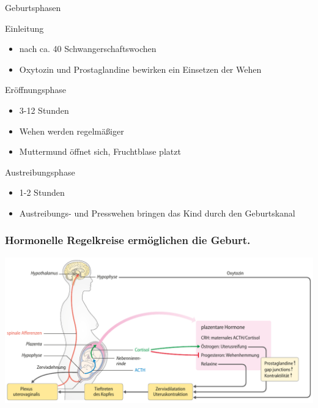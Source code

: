 \documentclass{beamer}
\begin{document}
\begin{frame}{Geburtsphasen}

\begin{block}{Einleitung}
\begin{itemize}
\item
nach ca.  40 Schwangerschaftswochen
\item
Oxytozin und Prostaglandine bewirken ein Einsetzen der Wehen
\end{itemize}
\end{block}

\pause

\begin{block}{Eröffnungsphase}
\begin{itemize}
\item
3-12 Stunden
\item
Wehen werden regelmäßiger
\item
Muttermund öffnet sich, Fruchtblase platzt
\end{itemize}
\end{block}

\pause

\begin{block}{Austreibungsphase}
\begin{itemize}
\item
1-2 Stunden
\item
Austreibungs- und Presswehen bringen das Kind durch den Geburtskanal
\end{itemize}
\end{block}


\end{frame}



\begin{frame}
\frametitle{Hormonelle Regelkreise ermöglichen die Geburt. }

\begin{center}
\includegraphics[width=\textwidth]{geburt_hormone}
\end{center}


\end{frame}
\end{document}
